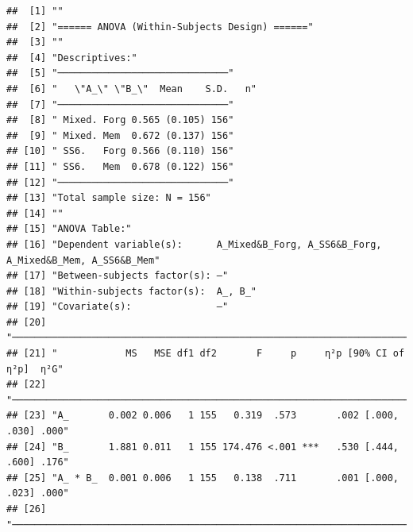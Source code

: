 \documentclass[
  man]{apa6}
\begin{document}
\begin{verbatim}
##  [1] ""                                                                                       
##  [2] "====== ANOVA (Within-Subjects Design) ======"                                           
##  [3] ""                                                                                       
##  [4] "Descriptives:"                                                                          
##  [5] "──────────────────────────────"                                                         
##  [6] "   \"A_\" \"B_\"  Mean    S.D.   n"                                                     
##  [7] "──────────────────────────────"                                                         
##  [8] " Mixed. Forg 0.565 (0.105) 156"                                                         
##  [9] " Mixed. Mem  0.672 (0.137) 156"                                                         
## [10] " SS6.   Forg 0.566 (0.110) 156"                                                         
## [11] " SS6.   Mem  0.678 (0.122) 156"                                                         
## [12] "──────────────────────────────"                                                         
## [13] "Total sample size: N = 156"                                                             
## [14] ""                                                                                       
## [15] "ANOVA Table:"                                                                           
## [16] "Dependent variable(s):      A_Mixed&B_Forg, A_SS6&B_Forg, A_Mixed&B_Mem, A_SS6&B_Mem"   
## [17] "Between-subjects factor(s): –"                                                          
## [18] "Within-subjects factor(s):  A_, B_"                                                     
## [19] "Covariate(s):               –"                                                          
## [20] "───────────────────────────────────────────────────────────────────────"                
## [21] "            MS   MSE df1 df2       F     p     η²p [90% CI of η²p]  η²G"                
## [22] "───────────────────────────────────────────────────────────────────────"                
## [23] "A_       0.002 0.006   1 155   0.319  .573       .002 [.000, .030] .000"                
## [24] "B_       1.881 0.011   1 155 174.476 <.001 ***   .530 [.444, .600] .176"                
## [25] "A_ * B_  0.001 0.006   1 155   0.138  .711       .001 [.000, .023] .000"                
## [26] "───────────────────────────────────────────────────────────────────────"                

\end{verbatim}
\end{document}
